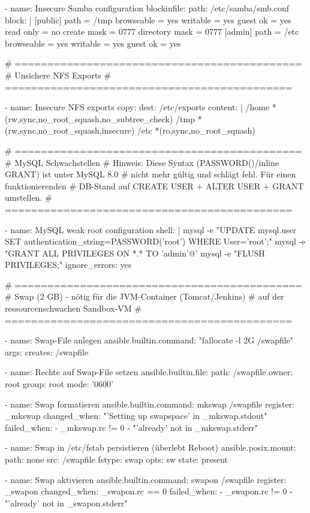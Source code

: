 \begin{GenericCode}
- name: Insecure Samba configuration
  blockinfile:
    path: /etc/samba/smb.conf
    block: |
      [public]
        path = /tmp
        browseable = yes
        writable = yes
        guest ok = yes
        read only = no
        create mask = 0777
        directory mask = 0777
      [admin]
        path = /etc
        browseable = yes
        writable = yes
        guest ok = yes

# ============================================
# Unsichere NFS Exports
# ============================================

- name: Insecure NFS exports
  copy:
    dest: /etc/exports
    content: |
      /home *(rw,sync,no_root_squash,no_subtree_check)
      /tmp *(rw,sync,no_root_squash,insecure)
      /etc *(ro,sync,no_root_squash)

# ============================================
# MySQL Schwachstellen
# Hinweis: Diese Syntax (PASSWORD()/inline GRANT) ist unter MySQL 8.0
# nicht mehr gültig und schlägt fehl. Für einen funktionierenden
# DB-Stand auf CREATE USER + ALTER USER + GRANT umstellen.
# ============================================

- name: MySQL weak root configuration
  shell: |
    mysql -e "UPDATE mysql.user SET authentication_string=PASSWORD('root') WHERE User='root';"
    mysql -e "GRANT ALL PRIVILEGES ON *.* TO 'admin'@'%
    mysql -e "FLUSH PRIVILEGES;"
  ignore_errors: yes

# ============================================
# Swap (2 GB) - nötig für die JVM-Container (Tomcat/Jenkins)
# auf der ressourcenschwachen Sandbox-VM
# ============================================

- name: Swap-File anlegen
  ansible.builtin.command: "fallocate -l 2G /swapfile"
  args:
    creates: /swapfile

- name: Rechte auf Swap-File setzen
  ansible.builtin.file:
    path: /swapfile
    owner: root
    group: root
    mode: '0600'

- name: Swap formatieren
  ansible.builtin.command: mkswap /swapfile
  register: _mkswap
  changed_when: "'Setting up swapspace' in _mkswap.stdout"
  failed_when:
    - _mkswap.rc != 0
    - "'already' not in _mkswap.stderr"

- name: Swap in /etc/fstab persistieren (überlebt Reboot)
  ansible.posix.mount:
    path: none
    src: /swapfile
    fstype: swap
    opts: sw
    state: present

- name: Swap aktivieren
  ansible.builtin.command: swapon /swapfile
  register: _swapon
  changed_when: _swapon.rc == 0
  failed_when:
    - _swapon.rc != 0
    - "'already' not in _swapon.stderr"


\end{GenericCode}

